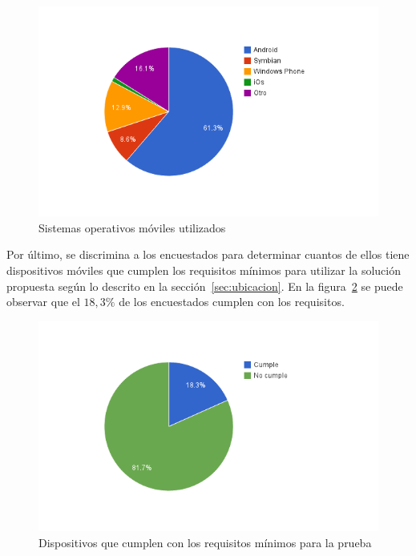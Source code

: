 \begin{figure}[ht!]
\centering
\includegraphics[scale=0.8]{resultados/imagenes/ubicacion_sistemas_operativos.png}
\caption{Sistemas operativos móviles utilizados}
\label{fig:ubicacion_sistemas_operativos}
\end{figure}

Por último, se discrimina a los encuestados para determinar cuantos de ellos
tiene dispositivos móviles que cumplen los requisitos mínimos para utilizar la
solución propuesta según lo descrito en la sección~\ref{sec:ubicacion}. En la
figura~\ref{fig:ubicacion_requisitos_minimos} se puede observar que el $18,3\%$
de los encuestados cumplen con los requisitos.

\begin{figure}[ht!]
\centering
\includegraphics[scale=0.8]{resultados/imagenes/ubicacion_requisitos_minimos.png}
\caption{Dispositivos que cumplen con los requisitos mínimos para la prueba}
\label{fig:ubicacion_requisitos_minimos}
\end{figure}

